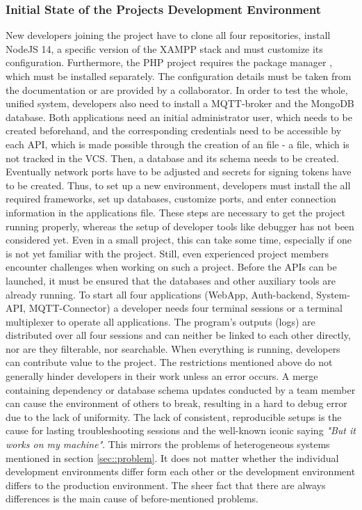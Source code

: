         \subsubsection{Initial State of the Projects Development Environment}
        New developers joining the project have to clone all four repositories, install NodeJS 14, a specific version of the \ac{XAMPP} stack and must customize its configuration. Furthermore, the PHP project requires the package manager , which must be installed separately. The configuration details must be taken from the documentation or are provided by a collaborator. In order to test the whole, unified system, developers also need to install a MQTT-broker and the MongoDB database. Both applications need an initial administrator user, which needs to be created beforehand, and the corresponding credentials need to be accessible by each \ac{API}, which is made possible through the creation of an  file - a file, which is not tracked in the \ac{VCS}. Then, a database and its schema needs to be created. Eventually network ports have to be adjusted and secrets for signing tokens have to be created.
        Thus, to set up a new environment, developers must install the all required frameworks, set up databases, customize ports, and enter connection information in the applications  file. These steps are necessary to get the project running properly, whereas the setup of developer tools like debugger has not been considered yet. Even in a small project, this can take some time, especially if one is not yet familiar with the project.\newline
        Still, even experienced project members encounter challenges when working on such a project. Before the APIs can be launched, it must be ensured that the databases and other auxiliary tools are already running. To start all four applications (WebApp, Auth-backend, System-API, MQTT-Connector) a developer needs four terminal sessions or a terminal multiplexer to operate all applications. The program's outputs (logs) are distributed over all four sessions and can neither be linked to each other directly, nor are they filterable, nor searchable. When everything is running, developers can contribute value to the project. The restrictions mentioned above do not generally hinder developers in their work unless an error occurs. A merge containing dependency or database schema updates conducted by a team member can cause the environment of others to break, resulting in a hard to debug error due to the lack of uniformity. The lack of consistent, reproducible setups is the cause for lasting troubleshooting sessions and the well-known iconic saying \textit{"But it works on my machine"}. This mirrors the problems of heterogeneous systems mentioned in section \ref{sec::problem}. It does not matter whether the individual development environments differ form each other or the development environment differs to the production environment. The sheer fact that there are always differences is the main cause of before-mentioned problems. \newline
